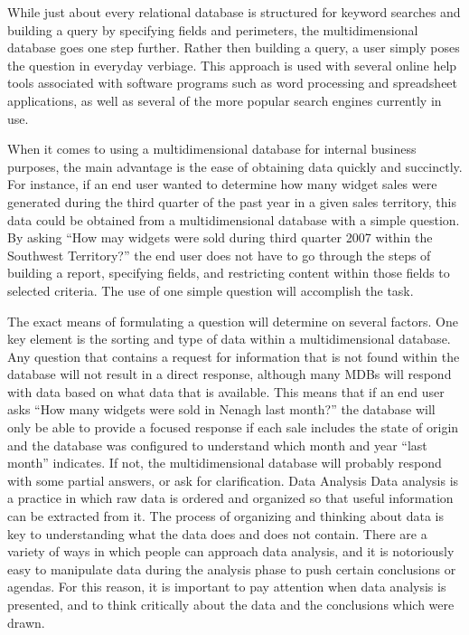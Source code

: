 While just about every relational database is structured for keyword searches and building a query by specifying fields and perimeters, the multidimensional database goes one step further. Rather then building a query, a user simply poses the question in everyday verbiage. This approach is used with several online help tools associated with software programs such as word processing and spreadsheet applications, as well as several of the more popular search engines currently in use.
 
When it comes to using a multidimensional database for internal business purposes, the main advantage is the ease of obtaining data quickly and succinctly. For instance, if an end user wanted to determine how many widget sales were generated during the third quarter of the past year in a given sales territory, this data could be obtained from a multidimensional database with a simple question. By asking “How may widgets were sold during third quarter 2007 within the Southwest Territory?” the end user does not have to go through the steps of building a report, specifying fields, and restricting content within those fields to selected criteria. The use of one simple question will accomplish the task.
 
The exact means of formulating a question will determine on several factors. One key element is the sorting and type of data within a multidimensional database. Any question that contains a request for information that is not found within the database will not result in a direct response, although many MDBs will respond with data based on what data that is available. This means that if an end user asks “How many widgets were sold in Nenagh last month?” the database will only be able to provide a focused response if each sale includes the state of origin and the database was configured to understand which month and year “last month” indicates. If not, the multidimensional database will probably respond with some partial answers, or ask for clarification.
Data Analysis
Data analysis is a practice in which raw data is ordered and organized so that useful information can be extracted from it. The process of organizing and thinking about data is key to understanding what the data does and does not contain. There are a variety of ways in which people can approach data analysis, and it is notoriously easy to manipulate data during the analysis phase to push certain conclusions or agendas. For this reason, it is important to pay attention when data analysis is presented, and to think critically about the data and the conclusions which were drawn.


